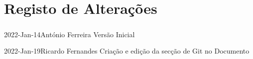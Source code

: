\chapter*{Registo de Alterações}
\paragraph{}

\begin{logentry}{2022-Jan-14}{António Ferreira}
Versão Inicial
\end{logentry}

\begin{logentry}{2022-Jan-19}{Ricardo Fernandes}
Criação e edição da secção de Git no Documento
\end{logentry}